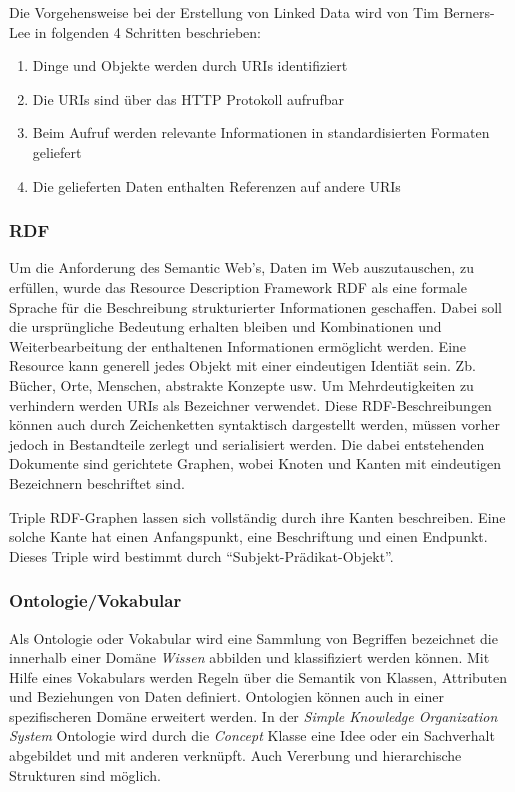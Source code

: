 Die Vorgehensweise bei der Erstellung von Linked Data wird von Tim Berners-Lee in folgenden 4 Schritten beschrieben:

\begin{enumerate}
	\item Dinge und Objekte werden durch URIs identifiziert
	\item Die URIs sind über das HTTP Protokoll aufrufbar
	\item Beim Aufruf werden relevante Informationen in standardisierten Formaten geliefert
	\item Die gelieferten Daten enthalten Referenzen auf andere URIs
\end{enumerate}
\subsubsection{RDF}

Um die Anforderung des Semantic Web’s, Daten im Web auszutauschen, zu erfüllen, wurde das Resource Description Framework RDF als eine formale Sprache für die Beschreibung strukturierter Informationen geschaffen. Dabei soll die ursprüngliche Bedeutung erhalten bleiben und Kombinationen und Weiterbearbeitung der enthaltenen Informationen ermöglicht werden.
Eine Resource kann generell jedes Objekt mit einer eindeutigen Identiät sein. Zb. Bücher, Orte, Menschen, abstrakte Konzepte usw. Um Mehrdeutigkeiten zu verhindern werden URIs als Bezeichner verwendet. Diese RDF-Beschreibungen können auch durch Zeichenketten syntaktisch dargestellt werden, müssen vorher jedoch in Bestandteile zerlegt und serialisiert werden. Die dabei entstehenden Dokumente sind gerichtete Graphen, wobei Knoten und Kanten mit eindeutigen Bezeichnern beschriftet sind. 
 
Triple
RDF-Graphen lassen sich vollständig durch ihre Kanten beschreiben. Eine solche Kante hat einen Anfangspunkt, eine Beschriftung und einen Endpunkt. Dieses Triple wird bestimmt durch “Subjekt-Prädikat-Objekt”.


\subsubsection{Ontologie/Vokabular}

Als Ontologie oder Vokabular wird eine Sammlung von Begriffen bezeichnet die innerhalb einer Domäne \textit{Wissen} abbilden und klassifiziert werden können. \cite{w3c} Mit Hilfe eines Vokabulars werden Regeln über die Semantik von Klassen, Attributen und Beziehungen von Daten definiert. Ontologien können auch in einer spezifischeren Domäne erweitert werden. In der \textit{Simple Knowledge Organization System} Ontologie wird durch die \textit{Concept} Klasse eine Idee oder ein Sachverhalt abgebildet und mit anderen verknüpft. Auch Vererbung und hierarchische Strukturen sind möglich.


